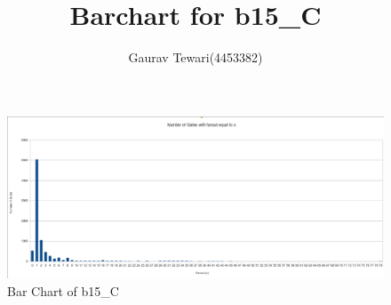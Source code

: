 \documentclass[a4paper,10pt]{article}
\theoremstyle{definition}
\def \papertitle {Barchart for b15\_C}
\def \paperauthor {Gaurav Tewari}
\begin{document}
\title {\papertitle}
\author{\paperauthor \quad(4453382)}
\date{}
\maketitle

\begin{figure}[htbp]
\caption{Bar Chart of b15\_C}
\centering
\includegraphics[width=1\textwidth]{barchart.png}
\end{figure}
\end{document}
